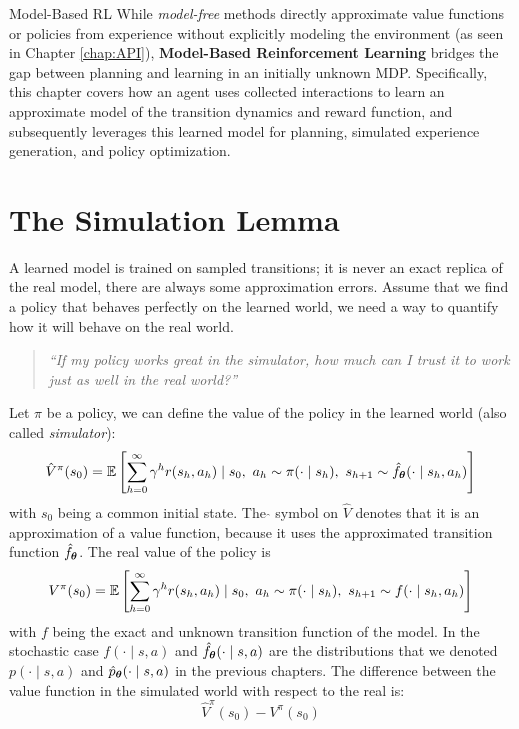 \documentclass[10pt, a4paper]{report}
\begin{document}
\begin{boxdefinition}{Model-Based RL}{}
    While \emph{model-free} methods directly approximate value functions or policies from experience without explicitly modeling the environment (as seen in Chapter \ref{chap:API}), \textbf{Model-Based Reinforcement Learning} bridges the gap between planning and learning in an initially unknown MDP. Specifically, this chapter covers how an agent uses collected interactions to learn an approximate model of the transition dynamics  and reward function, and subsequently leverages this learned model for planning, simulated experience generation, and policy optimization.
\end{boxdefinition}
\section{The Simulation Lemma}
A learned model is trained on sampled transitions; it is never an exact replica of the real model, there are always some approximation errors. Assume that we find a policy that behaves perfectly on the learned world, we need a way to quantify how it will behave on the real world.\begin{quote}
    \textit{``If my policy works great in the simulator, how much can I trust it to work just as well in the real world?''}
\end{quote}
Let $\pi$ be a policy, we can define the value of the policy in the learned world (also called \textit{simulator}):\begin{equation}
    \hat V^\pi(s_0)=\VA\left[
        \sum_{h=0}^\infty \gamma^hr(s_h,a_h)\mid s_0,\ a_h\sim\pi(\cdot\mid s_h),\ s_{h+1}\sim\hat f_\btheta(\cdot\mid s_h,a_h)
    \right]
\end{equation}
with $s_0$ being a common initial state.
The $\hat{}$ symbol on $\hat V$ denotes that it is an approximation of a value function, because it uses the approximated transition function $\hat f_{\boldsymbol{\theta}}$. The real value of the policy is\begin{equation}\label{sim_diff}
     V^\pi(s_0)=\VA\left[
        \sum_{h=0}^\infty \gamma^hr(s_h,a_h)\mid s_0,\ a_h\sim\pi(\cdot\mid s_h),\ s_{h+1}\sim f(\cdot\mid s_h,a_h)
    \right]
\end{equation}
with $f$ being the exact and unknown transition function of the model. In the stochastic case $f(\cdot\mid s,a)$ and $\hat f_{\boldsymbol{\theta}}(\cdot\mid s,a)$ are the distributions that we denoted $p(\cdot\mid s,a)$ and $\hat p_{\boldsymbol{\theta}}(\cdot\mid s,a)$ in the previous chapters. The difference between the value function in the simulated world with respect to the real is:\begin{equation}
     \hat V^\pi(s_0)-  V^\pi(s_0)
\end{equation}
\end{document}
